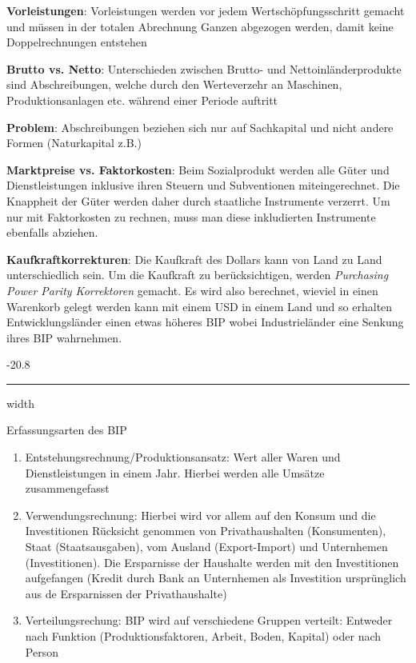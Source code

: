 \documentclass[9pt, landscape, fleqn]{scrartcl}
\makeatletter
\renewcommand{\subsubsection}{\@startsection{subsubsection}{1}{0mm}%
{-2\baselineskip}{0.8\baselineskip}%
{\hrule depth 0.2pt width\columnwidth\vspace*{1.2em}\normalsize\bfseries\rmfamily}}
\makeatother
\begin{document}
\begin{multicols*}{3}
\textbf{Vorleistungen}: Vorleistungen werden vor jedem Wertschöpfungsschritt gemacht und müssen in der totalen Abrechnung Ganzen abgezogen werden, damit keine Doppelrechnungen entstehen \\ \newline

\textbf{Brutto vs. Netto}: Unterschieden zwischen Brutto- und Nettoinländerprodukte sind Abschreibungen, welche durch den Werteverzehr an Maschinen, Produktionsanlagen etc. während einer Periode auftritt \newline \newline

\textbf{Problem}: Abschreibungen beziehen sich nur auf Sachkapital und nicht andere Formen (Naturkapital z.B.) \newline \newline

\textbf{Marktpreise vs. Faktorkosten}: Beim Sozialprodukt werden alle Güter und Dienstleistungen inklusive ihren Steuern und Subventionen miteingerechnet. Die Knappheit der Güter werden daher durch staatliche Instrumente verzerrt. Um nur mit Faktorkosten zu rechnen, muss man diese inkludierten Instrumente ebenfalls abziehen. \newline \newline 

\textbf{Kaufkraftkorrekturen}: Die Kaufkraft des Dollars kann von Land zu Land unterschiedlich sein. Um die Kaufkraft zu berücksichtigen, werden \emph{Purchasing Power Parity Korrektoren} gemacht. Es wird also berechnet, wieviel in einen Warenkorb gelegt werden kann mit einem USD in einem Land und so erhalten Entwicklungsländer einen etwas höheres BIP wobei Industrieländer eine Senkung ihres BIP wahrnehmen.

\subsubsection{Erfassungsarten des BIP}

\begin{enumerate}
    \item Entstehungsrechnung/Produktionsansatz: Wert aller Waren und Dienstleistungen in einem Jahr. Hierbei werden alle Umsätze zusammengefasst
    \item Verwendungsrechnung: Hierbei wird vor allem auf den Konsum und die Investitionen Rücksicht genommen von Privathaushalten (Konsumenten), Staat (Staatsausgaben), vom Ausland (Export-Import) und Unternhemen (Investitionen). Die Ersparnisse der Haushalte werden mit den Investitionen aufgefangen (Kredit durch Bank an Unternhemen als Investition ursprünglich aus de Ersparnissen der Privathaushalte)
    \item Verteilungsrechung: BIP wird auf verschiedene Gruppen verteilt: Entweder nach Funktion (Produktionsfaktoren, Arbeit, Boden, Kapital) oder nach Person
\end{enumerate}


\end{multicols*}
\end{document}
